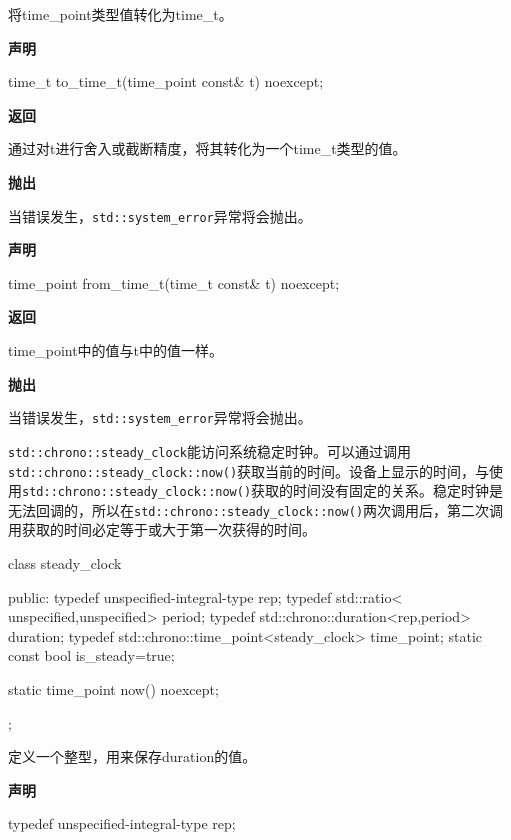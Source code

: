 将time\_point类型值转化为time\_t。

\textbf{声明}

\begin{cpp}
time_t to_time_t(time_point const& t) noexcept;
\end{cpp}

\textbf{返回}

通过对t进行舍入或截断精度，将其转化为一个time\_t类型的值。

\textbf{抛出}

当错误发生，\texttt{std::system\_error}异常将会抛出。


\textbf{声明}

\begin{cpp}
time_point from_time_t(time_t const& t) noexcept;
\end{cpp}

\textbf{返回}

time\_point中的值与t中的值一样。

\textbf{抛出}

当错误发生，\texttt{std::system\_error}异常将会抛出。


\texttt{std::chrono::steady\_clock}能访问系统稳定时钟。可以通过调用\texttt{std::chrono::steady\_clock::now()}获取当前的时间。设备上显示的时间，与使用\texttt{std::chrono::steady\_clock::now()}获取的时间没有固定的关系。稳定时钟是无法回调的，所以在\texttt{std::chrono::steady\_clock::now()}两次调用后，第二次调用获取的时间必定等于或大于第一次获得的时间。


\begin{cpp}
class steady_clock
{
public:
  typedef unspecified-integral-type rep;
  typedef std::ratio<
      unspecified,unspecified> period;
  typedef std::chrono::duration<rep,period> duration;
  typedef std::chrono::time_point<steady_clock>
      time_point;
  static const bool is_steady=true;

  static time_point now() noexcept;
};
\end{cpp}


定义一个整型，用来保存duration的值。

\textbf{声明}

\begin{cpp}
typedef unspecified-integral-type rep;
\end{cpp}

